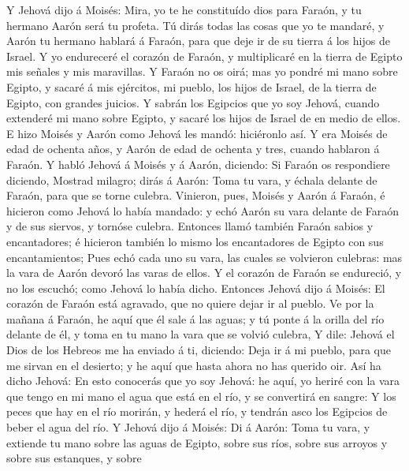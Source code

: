  Y Jehová dijo á Moisés: Mira, yo te he constituído dios
para Faraón, y tu hermano Aarón será tu profeta.  Tú dirás
todas las cosas que yo te mandaré, y Aarón tu hermano hablará á Faraón,
para que deje ir de su tierra á los hijos de Israel.  Y yo
endureceré el corazón de Faraón, y multiplicaré en la tierra de Egipto
mis señales y mis maravillas.  Y Faraón no os oirá; mas yo
pondré mi mano sobre Egipto, y sacaré á mis ejércitos, mi pueblo, los
hijos de Israel, de la tierra de Egipto, con grandes juicios.
 Y sabrán los Egipcios que yo soy Jehová, cuando extenderé
mi mano sobre Egipto, y sacaré los hijos de Israel de en medio de ellos.
 E hizo Moisés y Aarón como Jehová les mandó: hiciéronlo
así.  Y era Moisés de edad de ochenta años, y Aarón de
edad de ochenta y tres, cuando hablaron á Faraón.  Y habló
Jehová á Moisés y á Aarón, diciendo:  Si Faraón os
respondiere diciendo, Mostrad milagro; dirás á Aarón: Toma tu vara, y
échala delante de Faraón, para que se torne culebra. 
Vinieron, pues, Moisés y Aarón á Faraón, é hicieron como Jehová lo había
mandado: y echó Aarón su vara delante de Faraón y de sus siervos, y
tornóse culebra.  Entonces llamó también Faraón sabios y
encantadores; é hicieron también lo mismo los encantadores de Egipto con
sus encantamientos;  Pues echó cada uno su vara, las
cuales se volvieron culebras: mas la vara de Aarón devoró las varas de
ellos.  Y el corazón de Faraón se endureció, y no los
escuchó; como Jehová lo había dicho.  Entonces Jehová
dijo á Moisés: El corazón de Faraón está agravado, que no quiere dejar
ir al pueblo.  Ve por la mañana á Faraón, he aquí que él
sale á las aguas; y tú ponte á la orilla del río delante de él, y toma
en tu mano la vara que se volvió culebra,  Y dile: Jehová
el Dios de los Hebreos me ha enviado á ti, diciendo: Deja ir á mi
pueblo, para que me sirvan en el desierto; y he aquí que hasta ahora no
has querido oir.  Así ha dicho Jehová: En esto conocerás
que yo soy Jehová: he aquí, yo heriré con la vara que tengo en mi mano
el agua que está en el río, y se convertirá en sangre:  Y
los peces que hay en el río morirán, y hederá el río, y tendrán asco los
Egipcios de beber el agua del río.  Y Jehová dijo á
Moisés: Di á Aarón: Toma tu vara, y extiende tu mano sobre las aguas de
Egipto, sobre sus ríos, sobre sus arroyos y sobre sus estanques, y sobre
